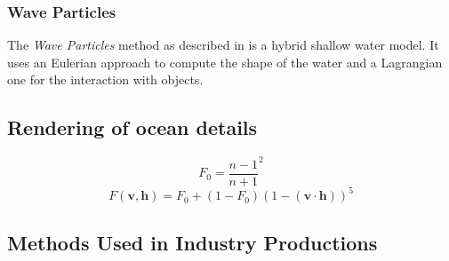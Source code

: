 \subsubsection{Wave Particles}\label{subsub:wave_particles}

The \textit{Wave Particles} method as described in \autocite{yuksel2007wave} is
a hybrid shallow water model. It uses an Eulerian approach to compute the shape
of the water and a Lagrangian one for the interaction with objects.


\subsection{Rendering of ocean details}\label{subsec:ocean_details}


\begin{equation}\label{eq:schlick_cst}
    F_0 = \frac{n - 1}{n + 1}^2
\end{equation}
\begin{equation}\label{eq:schlick}
    F(\textbf{v}, \textbf{h}) = F_0 + (1 - F_0) {(1 - (\textbf{v} \cdot
    \textbf{h}))}^5
\end{equation}

\subsection{Methods Used in Industry Productions}\label{subsec:methods_industry}

